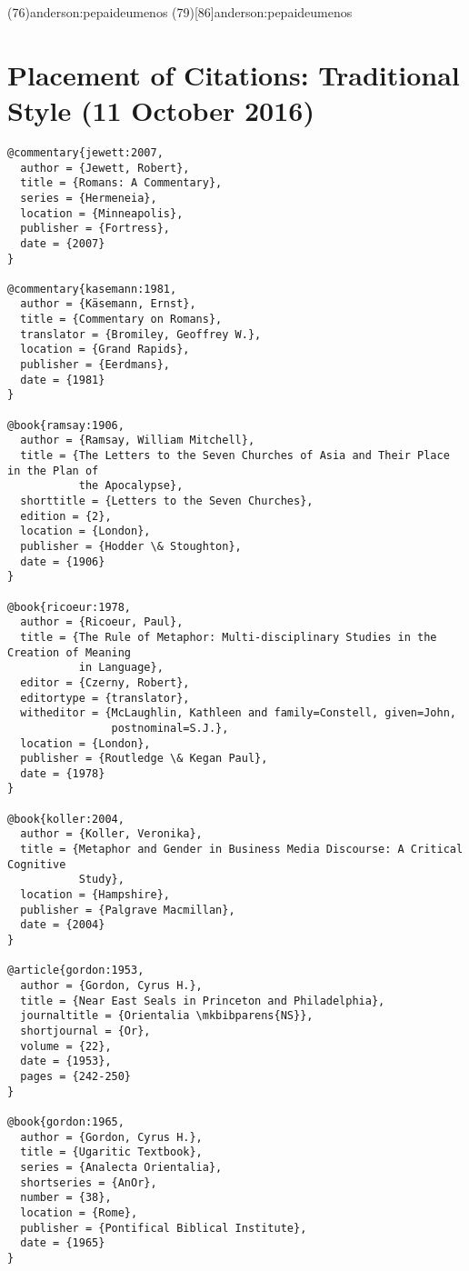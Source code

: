 \documentclass[a4paper]{article}
\begin{document}
\examplecite(76){anderson:pepaideumenos}
\examplecite(79)[86]{anderson:pepaideumenos}
\exampleabbreviations
\examplebibliography
{}

\section{Placement of Citations: Traditional Style (11 October 2016)}

\begin{verbatim}
@commentary{jewett:2007,
  author = {Jewett, Robert},
  title = {Romans: A Commentary},
  series = {Hermeneia},
  location = {Minneapolis},
  publisher = {Fortress},
  date = {2007}
}

@commentary{kasemann:1981,
  author = {Käsemann, Ernst},
  title = {Commentary on Romans},
  translator = {Bromiley, Geoffrey W.},
  location = {Grand Rapids},
  publisher = {Eerdmans},
  date = {1981}
}

@book{ramsay:1906,
  author = {Ramsay, William Mitchell},
  title = {The Letters to the Seven Churches of Asia and Their Place in the Plan of
           the Apocalypse},
  shorttitle = {Letters to the Seven Churches},
  edition = {2},
  location = {London},
  publisher = {Hodder \& Stoughton},
  date = {1906}
}

@book{ricoeur:1978,
  author = {Ricoeur, Paul},
  title = {The Rule of Metaphor: Multi-disciplinary Studies in the Creation of Meaning
           in Language},
  editor = {Czerny, Robert},
  editortype = {translator},
  witheditor = {McLaughlin, Kathleen and family=Constell, given=John,
                postnominal=S.J.},
  location = {London},
  publisher = {Routledge \& Kegan Paul},
  date = {1978}
}

@book{koller:2004,
  author = {Koller, Veronika},
  title = {Metaphor and Gender in Business Media Discourse: A Critical Cognitive
           Study},
  location = {Hampshire},
  publisher = {Palgrave Macmillan},
  date = {2004}
}

@article{gordon:1953,
  author = {Gordon, Cyrus H.},
  title = {Near East Seals in Princeton and Philadelphia},
  journaltitle = {Orientalia \mkbibparens{NS}},
  shortjournal = {Or},
  volume = {22},
  date = {1953},
  pages = {242-250}
}

@book{gordon:1965,
  author = {Gordon, Cyrus H.},
  title = {Ugaritic Textbook},
  series = {Analecta Orientalia},
  shortseries = {AnOr},
  number = {38},
  location = {Rome},
  publisher = {Pontifical Biblical Institute},
  date = {1965}
}


\end{verbatim}
\end{document}

